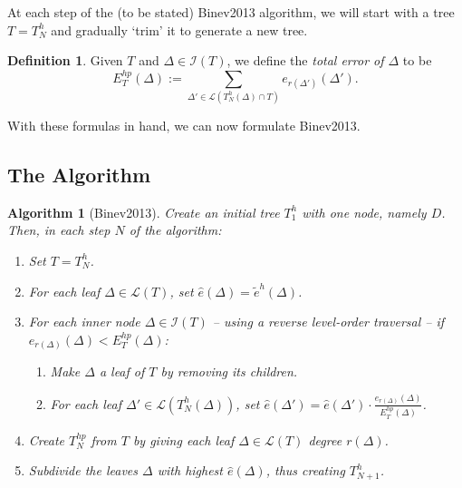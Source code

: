 \documentclass[11pt]{report}
\newtheorem{algorithm}{Algorithm}
\theoremstyle{definition}
\newtheorem{definition}{Definition}
\theoremstyle{remark}
\renewcommand{\L}{\mathcal{L}}
\newcommand{\I}{\mathcal{I}}
\newcommand{\hp}{{hp}}
\newcommand{\node}{\Delta}
\newcommand{\he}{\hat e}
\newcommand{\te}{\tilde e}
\begin{document}
At each step of the (to be stated) Binev2013 algorithm, we will start with a tree $T = T^h_N$ and gradually `trim' it to generate a new tree.
\begin{definition}
  Given $T$ and $\node \in \I(T)$, we define the \emph{total error of $\node$} to be
  \[
    E_T^\hp( \node) := \sum_{ \node' \in \L(T_N^h(\node) \cap T)} e_{r(\node')}(\node').
  \]
\end{definition}
With these formulas in hand, we can now formulate Binev2013.
\subsection{The Algorithm}
\begin{algorithm}[Binev2013\cite{2013}]
  \label{alg:2013}
  Create an initial tree $T^h_1$ with one node, namely $D$. Then, in each step $N$ of the algorithm:
  \begin{enumerate}
    \item Set $T = T^h_N$. \label{en:2013setT}
    \item For each leaf $\node \in \L(T)$, set $\he( \node) = \te^h(\node)$.\label{en:2013setleaf}
    \item For each inner node $\node \in \I(T)$ -- using a reverse level-order traversal -- if ${e_{r(\node)}(\node) < E_T^\hp(\node)}$:\label{en:2013setinner}
      \begin{enumerate}
        \item Make $\node$ a leaf of $T$ by removing its children.\label{en:2013trim}
        \item For each leaf $\node' \in \L(T^h_N(\node))$, set $\he(\node') = \he(\node') \cdot \frac{e_{r(\node)}(\node)}{E_T^\hp(\node)}$. \label{en:2013mult}
      \end{enumerate}
    \item Create $T^\hp_N$ from $T$ by giving each leaf $\node \in \L(T)$ degree $r(\node)$.\label{en:2013create}
    \item Subdivide the leaves $\node$ with highest $\he(\node)$, thus creating $T^h_{N+1}$.\label{en:2013subd}
  \end{enumerate}
\end{algorithm}
\end{document}
